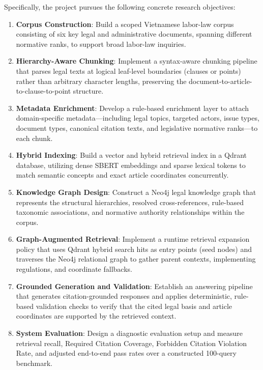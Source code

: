Specifically, the project pursues the following concrete research objectives:
\begin{enumerate}
    \item \textbf{Corpus Construction}: Build a scoped Vietnamese labor-law corpus consisting of six key legal and administrative documents, spanning different normative ranks, to support broad labor-law inquiries.
    \item \textbf{Hierarchy-Aware Chunking}: Implement a syntax-aware chunking pipeline that parses legal texts at logical leaf-level boundaries (clauses or points) rather than arbitrary character lengths, preserving the document-to-article-to-clause-to-point structure.
    \item \textbf{Metadata Enrichment}: Develop a rule-based enrichment layer to attach domain-specific metadata—including legal topics, targeted actors, issue types, document types, canonical citation texts, and legislative normative ranks—to each chunk.
    \item \textbf{Hybrid Indexing}: Build a vector and hybrid retrieval index in a Qdrant database, utilizing dense SBERT embeddings and sparse lexical tokens to match semantic concepts and exact article coordinates concurrently.
    \item \textbf{Knowledge Graph Design}: Construct a Neo4j legal knowledge graph that represents the structural hierarchies, resolved cross-references, rule-based taxonomic associations, and normative authority relationships within the corpus.
    \item \textbf{Graph-Augmented Retrieval}: Implement a runtime retrieval expansion policy that uses Qdrant hybrid search hits as entry points (seed nodes) and traverses the Neo4j relational graph to gather parent contexts, implementing regulations, and coordinate fallbacks.
    \item \textbf{Grounded Generation and Validation}: Establish an answering pipeline that generates citation-grounded responses and applies deterministic, rule-based validation checks to verify that the cited legal basis and article coordinates are supported by the retrieved context.
    \item \textbf{System Evaluation}: Design a diagnostic evaluation setup and measure retrieval recall, Required Citation Coverage, Forbidden Citation Violation Rate, and adjusted end-to-end pass rates over a constructed 100-query benchmark.
\end{enumerate}

